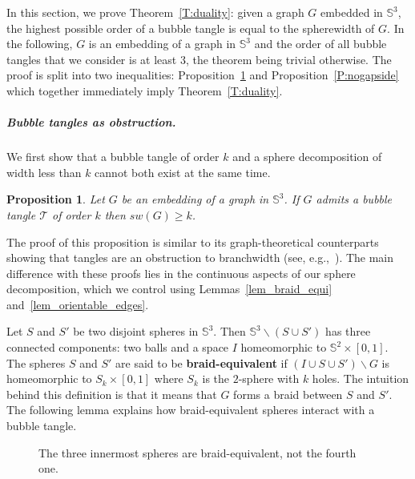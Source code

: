 \documentclass[11pt,a4paper]{article}
\newcommand{\Sp}{\mathbb S}
\newcommand{\bfdex}[1]{\textbf{#1}\index{#1}}
\newcommand{\T}{\mathcal{T}}
\newtheorem{proposition}[theorem]{Proposition}
\begin{document}
In this section, we prove Theorem~\ref{T:duality}: given a graph $G$ embedded in $\Sp^3$, the highest possible order of a bubble tangle is equal to the spherewidth of $G$. In the following, $G$ is an embedding of a graph in $\Sp^3$ and the order of all bubble tangles that we consider is at least $3$, the theorem being trivial otherwise. The proof is split into two inequalities: Proposition~\ref{prop_max_tangle_l_sw} and Proposition~\ref{P:nogapside} which together immediately imply Theorem~\ref{T:duality}.

\subparagraph*{Bubble tangles as obstruction.} We first show that a bubble tangle of order $k$ and a sphere decomposition of width less than $k$ cannot both exist at the same time.


\begin{proposition}\label{prop_max_tangle_l_sw}
Let $G$ be an embedding of a graph in $\Sp^3$. If $G$ admits a bubble tangle $\T$ of order $k$ then $sw(G) \geq k$.
\end{proposition}

The proof of this proposition is similar to its graph-theoretical counterparts showing that tangles are an obstruction to branchwidth (see, e.g.,~\cite{Graph_Minors_X}). The main difference with these proofs lies in the continuous aspects of our sphere decomposition, which we control using Lemmas~\ref{lem_braid_equi} and~\ref{lem_orientable_edges}.

Let $S$ and $S'$ be two disjoint spheres in $\Sp^3$. Then $\Sp^3 \smallsetminus (S \cup S')$ has three connected components: two balls and a space $I$ homeomorphic to $\Sp^2 \times [0,1]$. The spheres $S$ and $S'$ are said to be \bfdex{braid-equivalent} if $(I \cup S \cup S') \smallsetminus G$ is homeomorphic to $S_k \times [0,1]$ where $S_k$ is the $2$-sphere with $k$ holes. The intuition behind this definition is that it means that $G$ forms a braid between $S$ and $S'$. The following lemma explains how braid-equivalent spheres interact with a bubble tangle.


\begin{figure}[h]
\begin{center}
\label{pic_braid_equi_def}
\caption{The three innermost spheres are braid-equivalent, not the fourth one.}
\end{center}
\end{figure}
\end{document}
